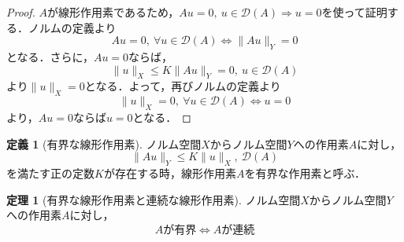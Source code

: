 \documentclass[11pt,a4paper,titlepage]{jsreport}
\theoremstyle{definition}
\newtheorem{dfn}{定義}
\newtheorem{thm}{定理}
\begin{document}
\begin{proof}
  $A$が線形作用素であるため，$Au=0,\ u\in\mathcal{D}(A)\Rightarrow u=0$を使って証明する．ノルムの定義より
  \begin{equation*}
    Au=0,\ \forall u\in\mathcal{D}(A)\Leftrightarrow\|Au\|_Y=0
  \end{equation*}
  となる．さらに，$Au=0$ならば，
  \begin{equation*}
    \|u\|_X \leq K\|Au\|_Y=0,\ u\in\mathcal{D}(A)
  \end{equation*}
  より$\|u\|_X=0$となる．よって，再びノルムの定義より
  \begin{equation*}
    \|u\|_X=0,\ \forall u\in\mathcal{D}(A)\Leftrightarrow u=0
  \end{equation*}
  より，$Au=0$ならば$u=0$となる．
\end{proof}

\begin{dfn}[有界な線形作用素]
  ノルム空間$X$からノルム空間$Y$への作用素$A$に対し，
  \begin{equation*}
    \|Au\|_Y\leq K\|u\|_X,\ \mathcal{D}(A)
  \end{equation*}
  を満たす正の定数$K$が存在する時，線形作用素$A$を有界な作用素と呼ぶ．
\end{dfn}

\begin{thm}[有界な線形作用素と連続な線形作用素]
  ノルム空間$X$からノルム空間$Y$への作用素$A$に対し，
  \begin{equation*}
    Aが有界\Leftrightarrow Aが連続
  \end{equation*}
\end{thm}
\end{document}

